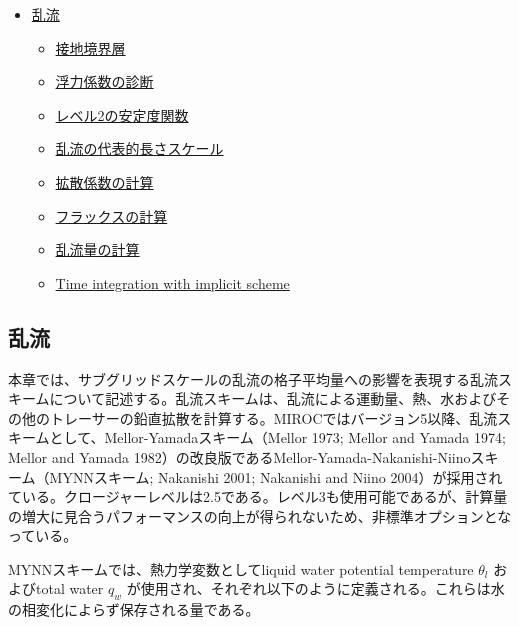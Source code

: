 \begin{itemize}
\tightlist
\item
  \protect\hyperlink{ux4e71ux6d41}{乱流}

  \begin{itemize}
  \tightlist
  \item
    \protect\hyperlink{ux63a5ux5730ux5883ux754cux5c64}{接地境界層}
  \item
    \protect\hyperlink{ux6d6eux529bux4fc2ux6570ux306eux8a3aux65ad}{浮力係数の診断}
  \item
    \protect\hyperlink{ux30ecux30d9ux30eb2ux306eux5b89ux5b9aux5ea6ux95a2ux6570}{レベル2の安定度関数}
  \item
    \protect\hyperlink{ux4e71ux6d41ux306eux4ee3ux8868ux7684ux9577ux3055ux30b9ux30b1ux30fcux30eb}{乱流の代表的長さスケール}
  \item
    \protect\hyperlink{ux62e1ux6563ux4fc2ux6570ux306eux8a08ux7b97}{拡散係数の計算}
  \item
    \protect\hyperlink{ux30d5ux30e9ux30c3ux30afux30b9ux306eux8a08ux7b97}{フラックスの計算}
  \item
    \protect\hyperlink{ux4e71ux6d41ux91cfux306eux8a08ux7b97}{乱流量の計算}
  \item
    \protect\hyperlink{time-integration-with-implicit-scheme}{Time
    integration with implicit scheme}
  \end{itemize}
\end{itemize}

\hypertarget{ux4e71ux6d41}{%
\subsection{乱流}\label{ux4e71ux6d41}}

本章では、サブグリッドスケールの乱流の格子平均量への影響を表現する乱流スキームについて記述する。乱流スキームは、乱流による運動量、熱、水およびその他のトレーサーの鉛直拡散を計算する。MIROCではバージョン5以降、乱流スキームとして、Mellor-Yamadaスキーム（Mellor
1973; Mellor and Yamada 1974; Mellor and Yamada
1982）の改良版であるMellor-Yamada-Nakanishi-Niinoスキーム（MYNNスキーム;
Nakanishi 2001; Nakanishi and Niino
2004）が採用されている。クロージャーレベルは2.5である。レベル3も使用可能であるが、計算量の増大に見合うパフォーマンスの向上が得られないため、非標準オプションとなっている。

MYNNスキームでは、熱力学変数としてliquid water potential temperature
\(\theta_l\) およびtotal water \(q_w\)
が使用され、それぞれ以下のように定義される。これらは水の相変化によらず保存される量である。

